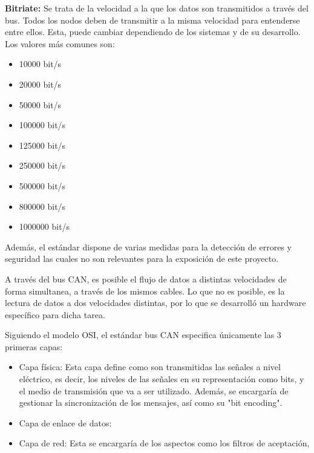 

\textbf{Bitriate:} Se trata de la velocidad a la que los datos son transmitidos a través del bus. Todos los nodos deben de transmitir a la misma velocidad para entenderse entre ellos. Esta, puede cambiar dependiendo de los sistemas y de su desarrollo.
Los valores más comunes son:

\begin{itemize}
\tightlist
\item
10000 bit/s
\item
20000 bit/s
\item
50000 bit/s
\item
100000 bit/s
\item
125000 bit/s
\item
250000 bit/s
\item
500000 bit/s
\item
800000 bit/s
\item
1000000 bit/s
\end{itemize}


Además, el estándar dispone de varias medidas para la detección de errores y seguridad las cuales no son relevantes para la exposición de este proyecto.

A través del bus CAN, es posible el flujo de datos a distintas velocidades de forma simultanea, a través de los mismos cables. Lo que no es posible, es la lectura de datos a dos velocidades distintas, por lo que se desarrolló un hardware específico para dicha tarea.



Siguiendo el modelo OSI, el estándar bus CAN especifica únicamente las 3 primeras capas:

\begin{itemize}

\item
Capa física: Esta capa define como son transmitidas las señales a nivel eléctrico, es decir, los niveles de las señales en su representación como bits, y el medio de transmisión que va a ser utilizado. Además, se encargaría de gestionar la sincronización de los mensajes, así como su "bit encoding".

\item
Capa de enlace de datos:

\item
Capa de red: Esta se encargaría de los aspectos como los filtros de aceptación, 

\end{itemize}


